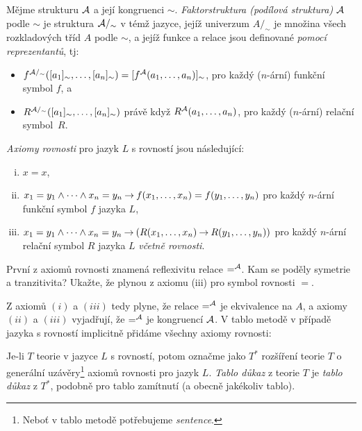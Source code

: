 \begin{definition}[Faktorstruktura]
    Mějme strukturu $\mathcal{A}$ a její kongruenci $\sim$. \emph{Faktorstruktura (podílová struktura)} $\mathcal{A}$ podle $\sim$ je struktura $\mathcal{A}/_\sim$ v témž jazyce, jejíž univerzum $A/_\sim$ je množina všech rozkladových tříd $A$ podle $\sim$, a jejíž funkce a relace jsou definované \emph{pomocí reprezentantů}, tj:
    \begin{itemize}
        \item $f^{\mathcal{A}/_\sim}([a_1]_\sim,\dots,[a_n]_\sim)=[f^{\mathcal{A}}(a_1,\dots,a_n)]_\sim$, pro každý ($n$-ární) funkční symbol $f$, a
        \item $R^{\mathcal{A}/_\sim}([a_1]_\sim,\dots,[a_n]_\sim)$ právě když $R^{\mathcal{A}}(a_1,\dots,a_n)$, pro každý ($n$-ární) relační symbol~$R$.
    \end{itemize} 
    
\end{definition}


\begin{definition}
    \emph{Axiomy rovnosti} pro jazyk $L$ s rovností jsou následující:
    \begin{enumerate}[(i)]
        \item $x=x$,
        \item $x_1=y_1\land\cdots\land x_n=y_n\mathbin{\rightarrow} f(x_1,\dots,x_n)=f(y_1,\dots,y_n)$ pro každý $n$-ární funkční symbol $f$ jazyka $L$,
        \item $x_1=y_1\land\cdots\land x_n=y_n\mathbin{\rightarrow} (R(x_1,\dots,x_n)\mathbin{\rightarrow} R(y_1,\dots,y_n))$ pro každý $n$-ární relační symbol $R$ jazyka $L$ \emph{včetně rovnosti}.
    \end{enumerate}
\end{definition}

\begin{exercise}
    První z axiomů rovnosti znamená reflexivitu relace $=^{\mathcal{A}}$. Kam se poděly symetrie a tranzitivita? Ukažte, že plynou z axiomu (iii) pro symbol rovnosti $=$.
\end{exercise}

Z axiomů $(i)$ a $(iii)$ tedy plyne, že relace $=^{\mathcal{A}}$ je ekvivalence na $A$, a axiomy $(ii)$ a $(iii)$ vyjadřují, že $=^{\mathcal{A}}$ je kongruencí $\mathcal{A}$. V tablo metodě v případě jazyka s rovností implicitně přidáme všechny axiomy rovnosti:

\begin{definition}
    Je-li $T$ teorie v jazyce $L$ s rovností, potom označme jako $T^*$ rozšíření teorie $T$ o generální uzávěry\footnote{Neboť v tablo metodě potřebujeme \emph{sentence}.} axiomů rovnosti pro jazyk $L$. \emph{Tablo důkaz} z teorie $T$ je \emph{tablo důkaz} z $T^*$, podobně pro tablo zamítnutí (a obecně jakékoliv tablo).    
\end{definition}

